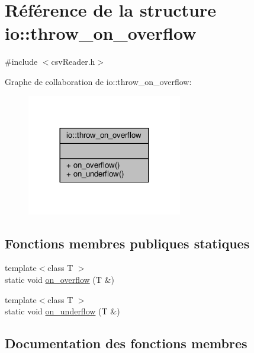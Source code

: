 \hypertarget{structio_1_1throw__on__overflow}{}\section{Référence de la structure io\+:\+:throw\+\_\+on\+\_\+overflow}
\label{structio_1_1throw__on__overflow}


{\ttfamily \#include $<$csv\+Reader.\+h$>$}



Graphe de collaboration de io\+:\+:throw\+\_\+on\+\_\+overflow\+:\nopagebreak
\begin{figure}[H]
\begin{center}
\leavevmode
\includegraphics[width=192pt]{structio_1_1throw__on__overflow__coll__graph}
\end{center}
\end{figure}
\subsection*{Fonctions membres publiques statiques}
\begin{DoxyCompactItemize}
\item 
{\footnotesize template$<$class T $>$ }\\static void \hyperlink{structio_1_1throw__on__overflow_a0a59c1dc2ead1a9275c62885ec7545d2}{on\+\_\+overflow} (T \&)
\item 
{\footnotesize template$<$class T $>$ }\\static void \hyperlink{structio_1_1throw__on__overflow_a2ae91b1ae3d655c16f7e6a7e9a1abd92}{on\+\_\+underflow} (T \&)
\end{DoxyCompactItemize}


\subsection{Documentation des fonctions membres}
\mbox{\label{structio_1_1throw__on__overflow_a0a59c1dc2ead1a9275c62885ec7545d2}} 
